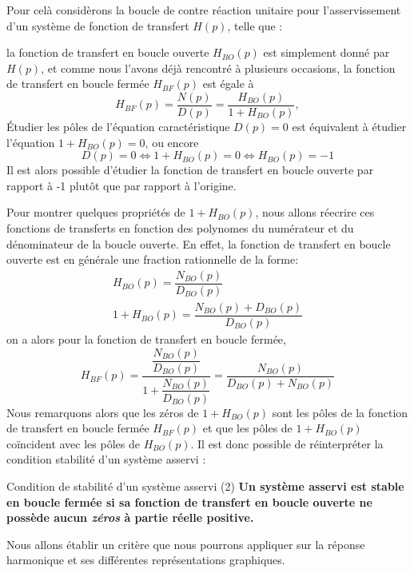 Pour celà considèrons la boucle de contre réaction unitaire 
pour l'asservissement d'un système de fonction de transfert $H(p)$, telle que :
\begin{center}
    
\end{center}
la fonction de transfert en boucle ouverte $H_{BO}(p)$ est simplement donné 
par $H(p)$, et comme nous l'avons déjà rencontré à plusieurs occasions, la 
fonction de transfert en boucle fermée $H_{BF}(p)$ est égale à 
\[
    H_{BF}(p)=\dfrac{N(p)}{D(p)}=\dfrac{H_{BO}(p)}{1+H_{BO}(p)},
\]
\'Etudier les pôles de l'équation caractéristique $D(p)=0$ est équivalent 
à étudier l'équation $1+H_{BO}(p)=0$, ou encore 
\[
    D(p)=0\Leftrightarrow1+H_{BO}(p)=0\Leftrightarrow H_{BO}(p)=-1
\]
Il est alors possible d'étudier la fonction de transfert en boucle ouverte par 
rapport à -1 plutôt que par rapport à l'origine. 

Pour montrer quelques propriétés de $1+H_{BO}(p)$, nous allons réecrire
ces fonctions de transferts en fonction des polynomes du numérateur et
du dénominateur de la boucle ouverte.
En effet, la fonction de transfert en boucle ouverte
est en générale une fraction rationnelle de la forme:
\begin{align*}
H_{BO}(p)=\dfrac{N_{BO}(p)}{D_{BO}(p)} \\
1+H_{BO}(p)=\dfrac{N_{BO}(p)+D_{BO}(p)}{D_{BO}(p)}
\end{align*}
on a alors pour la fonction de transfert en boucle fermée, 
\[
H_{BF}(p)=\dfrac{\dfrac{N_{BO}(p)}{D_{BO}(p)}}{1+\dfrac{N_{BO}(p)}{D_{BO}(p)}}
         =\dfrac{N_{BO}(p)}{D_{BO}(p)+N_{BO}(p)}
\]
Nous remarquons alors que les zéros de $1+H_{BO}(p)$ 
sont les pôles de la fonction de transfert en boucle fermée 
$H_{BF}(p)$ et que les pôles de $1+H_{BO}(p)$ co\"incident avec 
les pôles de $H_{BO}(p)$. Il est donc possible de 
réinterpréter la condition stabilité d'un système asservi :
\begin{criteria}{Condition de stabilité d'un système asservi (2)}
    \textbf{Un système asservi est stable en boucle fermée si sa fonction 
    de transfert en boucle ouverte ne possède aucun \emph{zéros} à partie 
    réelle positive.}
\end{criteria}
Nous allons établir un critère que nous pourrons appliquer sur la réponse 
harmonique et ses différentes représentations graphiques.

